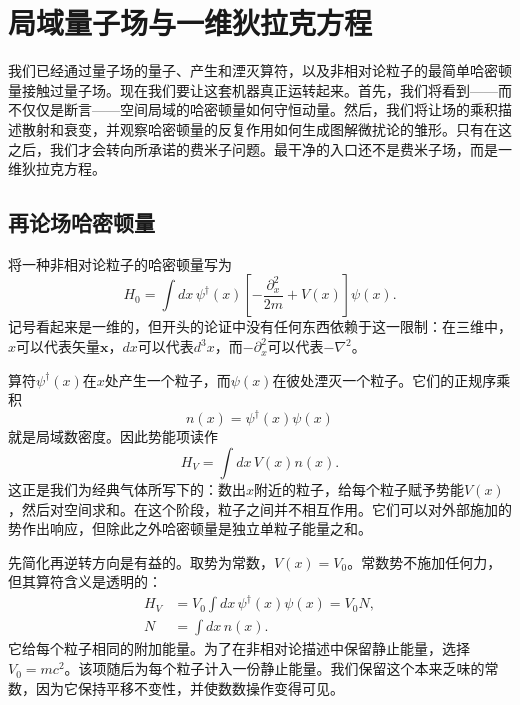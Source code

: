 \chapter{局域量子场与一维狄拉克方程}

我们已经通过量子场的量子、产生和湮灭算符，以及非相对论粒子的最简单哈密顿量接触过量子场。现在我们要让这套机器真正运转起来。首先，我们将看到——而不仅仅是断言——空间局域的哈密顿量如何守恒动量。然后，我们将让场的乘积描述散射和衰变，并观察哈密顿量的反复作用如何生成图解微扰论的雏形。只有在这之后，我们才会转向所承诺的费米子问题。最干净的入口还不是费米子场，而是一维狄拉克方程。

\section{再论场哈密顿量}

将一种非相对论粒子的哈密顿量写为
\begin{equation}
H_0=\int dx\,
\psi^\dagger(x)
\left[-\frac{\partial_x^2}{2m}+V(x)\right]
\psi(x).
\label{eq:l9-nonrel-hamiltonian}
\end{equation}
记号看起来是一维的，但开头的论证中没有任何东西依赖于这一限制：在三维中，\(x\)可以代表矢量\(\mathbf{x}\)，\(dx\)可以代表\(d^3x\)，而\(-\partial_x^2\)可以代表\(-\nabla^2\)。

算符\(\psi^\dagger(x)\)在\(x\)处产生一个粒子，而\(\psi(x)\)在彼处湮灭一个粒子。它们的正规序乘积
\begin{equation}
n(x)=\psi^\dagger(x)\psi(x)
\end{equation}
就是局域数密度。因此势能项读作
\begin{equation}
H_V=\int dx\,V(x)n(x).
\end{equation}
这正是我们为经典气体所写下的：数出\(x\)附近的粒子，给每个粒子赋予势能\(V(x)\)，然后对空间求和。在这个阶段，粒子之间并不相互作用。它们可以对外部施加的势作出响应，但除此之外哈密顿量是独立单粒子能量之和。

先简化再逆转方向是有益的。取势为常数，\(V(x)=V_0\)。常数势不施加任何力，但其算符含义是透明的：
\begin{equation}
\begin{aligned}
H_V&=V_0\int dx\,\psi^\dagger(x)\psi(x)=V_0N,\\
N&=\int dx\,n(x).
\end{aligned}
\end{equation}
它给每个粒子相同的附加能量。为了在非相对论描述中保留静止能量，选择\(V_0=mc^2\)。该项随后为每个粒子计入一份静止能量。我们保留这个本来乏味的常数，因为它保持平移不变性，并使数数操作变得可见。

